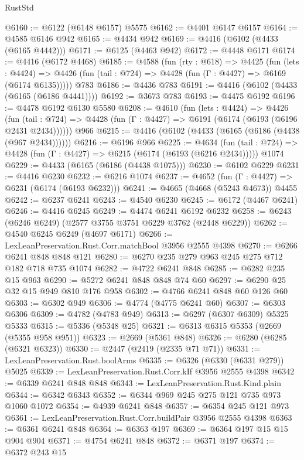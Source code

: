 \begin{lexlean}{RustStd}
\begin{coremodule}
@6160 := @6122 (@6148 @6157) @5575
@6162 := @4401 @6147 @6157
@6164 := @4585 @6146 @942
@6165 := @4434 @942
@6169 := @4416 (@6102 (@4433 (@6165 @4442)))
@6171 := @6125 (@4463 @942)
@6172 := @4448 @6171
@6174 := @4416 (@6172 @4468)
@6185 := @4588
    (fun (rty : @618) =>
    @4425
      (fun (lets : @4424) =>
      @4426 (fun (tail : @724) => @4428 (fun (Γ : @4427) => @6169 (@6174 @6135)))))
    @783
@6186 := @4436 @783
@6191 := @4416 (@6102 (@4433 (@6165 (@6186 @4441))))
@6192 := @3673 @783
@6193 := @4475 @6192
@6196 := @4478 @6192 @6130 @5580
@6208 := @4610
    (fun (lets : @4424) =>
    @4426
      (fun (tail : @724) => @4428 (fun (Γ : @4427) => @6191 (@6174 (@6193 (@6196 @2431 @2434))))))
    @966
@6215 := @4416 (@6102 (@4433 (@6165 (@6186 (@4438 (@967 @2434))))))
@6216 := @6196 @966
@6225 := @4634
    (fun (tail : @724) => @4428 (fun (Γ : @4427) => @6215 (@6174 (@6193 (@6216 @2434)))))
    @1074
@6229 := @4433 (@6165 (@6186 (@4438 @1075)))
@6230 := @6102 @6229
@6231 := @4416 @6230
@6232 := @6216 @1074
@6237 := @4652 (fun (Γ : @4427) => @6231 (@6174 (@6193 @6232)))
@6241 := @4665 (@4668 (@5243 @4673)) @4455
@6242 := @6237 @6241
@6243 := @4540 @6230
@6245 := @6172 (@4467 @6241)
@6246 := @4416 @6245
@6249 := @4474 @6241 @6192 @6232
@6258 := @6243 (@6246 @6249) (@2577 @3755 @3751 @6229 @3762 (@2448 @6229))
@6262 := @4540 @6245 @6249 (@4697 @6171)
@6266 := LexLeanPreservation.Rust.Corr.matchBool @3956 @2555 @4398
@6270 := @6266 @6241 @848 @848 @121
@6280 := @6270 @235 @279 @963 @245 @275 @712 @182 @718 @735 @1074
@6282 := @4722 @6241 @848
@6285 := @6282 @235 @15 @963
@6290 := @5272 @6241 @848 @848 @74 @60
@6297 := @6290 @25 @32 @15 @949 @810 @176 @958
@6302 := @4766 @6241 @848 @60 @126 @60
@6303 := @6302 @949
@6306 := @4774 (@4775 @6241 @60)
@6307 := @6303 @6306
@6309 := @4782 (@4783 @949)
@6313 := @6297 (@6307 @6309) @5325 @5333
@6315 := @5336 (@5348 @25)
@6321 := @6313 @6315 @5353 (@2669 (@5355 @958 @951))
@6323 := @2669 (@5361 @848)
@6326 := @6280 (@6285 (@6321 @6323))
@6330 := @2447 (@2419 (@2335 @71 @71))
@6331 := LexLeanPreservation.Rust.boolArms
@6335 := @6326 (@6330 (@6331 @279)) @5025
@6339 := LexLeanPreservation.Rust.Corr.kIf @3956 @2555 @4398
@6342 := @6339 @6241 @848 @848
@6343 := LexLeanPreservation.Rust.Kind.plain
@6344 := @6342 @6343
@6352 := @6344 @969 @245 @275 @121 @735 @973 @1060 @1072
@6354 := @4939 @6241 @848
@6357 := @6354 @245 @121 @973
@6361 := LexLeanPreservation.Rust.Corr.buildPair @3956 @2555 @4398
@6363 := @6361 @6241 @848
@6364 := @6363 @197
@6369 := @6364 @197 @15 @15 @904 @904
@6371 := @4754 @6241 @848
@6372 := @6371 @197
@6374 := @6372 @243 @15

\end{coremodule}
\end{lexlean}

